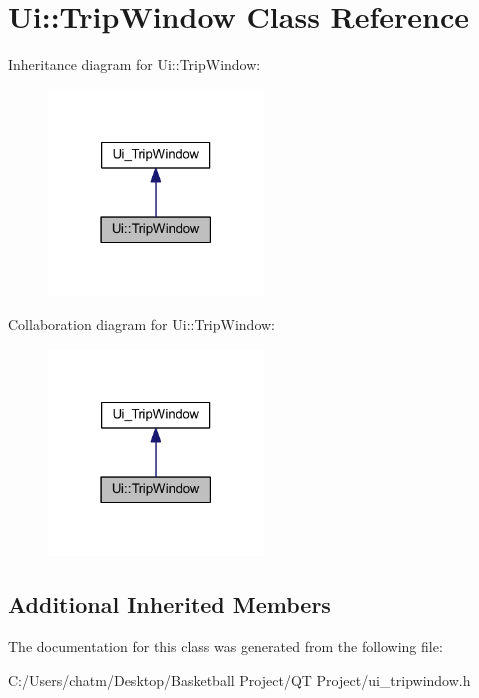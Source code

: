 \hypertarget{class_ui_1_1_trip_window}{}\section{Ui\+::Trip\+Window Class Reference}
\label{class_ui_1_1_trip_window}


Inheritance diagram for Ui\+::Trip\+Window\+:\nopagebreak
\begin{figure}[H]
\begin{center}
\leavevmode
\includegraphics[width=162pt]{class_ui_1_1_trip_window__inherit__graph}
\end{center}
\end{figure}


Collaboration diagram for Ui\+::Trip\+Window\+:\nopagebreak
\begin{figure}[H]
\begin{center}
\leavevmode
\includegraphics[width=162pt]{class_ui_1_1_trip_window__coll__graph}
\end{center}
\end{figure}
\subsection*{Additional Inherited Members}


The documentation for this class was generated from the following file\+:\begin{DoxyCompactItemize}
\item 
C\+:/\+Users/chatm/\+Desktop/\+Basketball Project/\+Q\+T Project/ui\+\_\+tripwindow.\+h\end{DoxyCompactItemize}
